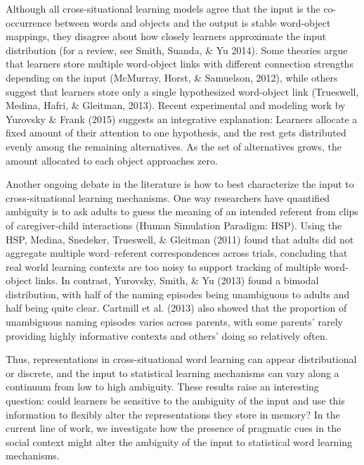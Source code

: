 \documentclass[a4paper,man,floatsintext]{apa6}
\begin{document}
Although all cross-situational learning models agree that the input is
the co-occurrence between words and objects and the output is stable
word-object mappings, they disagree about how closely learners
approximate the input distribution (for a review, see Smith, Suanda, \&
Yu 2014). Some theories argue that learners store multiple word-object
links with different connection strengths depending on the input
(McMurray, Horst, \& Samuelson, 2012), while others suggest that
learners store only a single hypothesized word-object link (Trueswell,
Medina, Hafri, \& Gleitman, 2013). Recent experimental and modeling work
by Yurovsky \& Frank (2015) suggests an integrative explanation:
Learners allocate a fixed amount of their attention to one hypothesis,
and the rest gets distributed evenly among the remaining alternatives.
As the set of alternatives grows, the amount allocated to each object
approaches zero.

Another ongoing debate in the literature is how to best characterize the
input to cross-situational learning mechanisms. One way researchers have
quantified ambiguity is to ask adults to guess the meaning of an
intended referent from clips of caregiver-child interactions (Human
Simulation Paradigm: HSP). Using the HSP, Medina, Snedeker, Trueswell,
\& Gleitman (2011) found that adults did not aggregate multiple
word--referent correspondences across trials, concluding that real world
learning contexts are too noisy to support tracking of multiple
word-object links. In contrast, Yurovsky, Smith, \& Yu (2013) found a
bimodal distribution, with half of the naming episodes being unambiguous
to adults and half being quite clear. Cartmill et al. (2013) also showed
that the proportion of unambiguous naming episodes varies across
parents, with some parents' rarely providing highly informative contexts
and others' doing so relatively often.

Thus, representations in cross-situational word learning can appear
distributional or discrete, and the input to statistical learning
mechanisms can vary along a continuum from low to high ambiguity. These
results raise an interesting question: could learners be sensitive to
the ambiguity of the input and use this information to flexibly alter
the representations they store in memory? In the current line of work,
we investigate how the presence of pragmatic cues in the social context
might alter the ambiguity of the input to statistical word learning
mechanisms.
\end{document}
